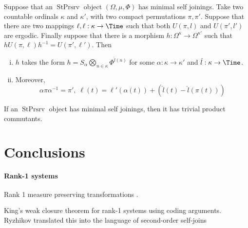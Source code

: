 \documentclass[12pt,oneside,pb-diagram]{article}
\DeclareMathOperator{\sps}{StPrsrv}
\begin{document}
\begin{definition} 
	
\end{definition}

\begin{lemma}
	\cite[Thm 3.1]{Rudolph1979join} Suppose that an $\sps$ object $(\Omega, \mu, \Phi)$ has minimal self joinings. Take two countable ordinals $\kappa$ and $\kappa'$, with two compact permutations $\pi , \pi'$. Suppose that there are two mappings $\ell, \ell : \kappa \to \Time$ such that both $U(\pi, l)$ and $U(\pi', l')$ are ergodic. Finally suppose that there is a morphism $h : \Omega^{\kappa} \to \Omega^{\kappa'}$ such that $h U(\pi, \ell) h^{-1} = U(\pi', \ell')$. Then
	\begin{enumerate} [(i)]
		\item $h$ takes the form $h = S_\alpha \bigotimes_{n \in \kappa} \Phi^{\hat{l}(n)}$ for some $\alpha : \kappa \to \kappa'$ and $\hat{l} : \kappa \to \Time$.
		\item Moreover,
		\[ \alpha \pi \alpha^{-1} = \pi', \; \ell(t) = \ell'(\alpha(t)) + (\hat{l}(t) - \hat{l}(\pi(t))) \]
	\end{enumerate}
\end{lemma}

\begin{lemma}
	\cite[Cor 3.2]{Rudolph1979join} If an $\sps$ object has minimal self joinings, then it has trivial product commutants.
\end{lemma}

\section{Conclusions} \label{sec:conclus}

\paragraph{Rank-1 systems} Rank 1 measure preserving transformations \cite[e.g.]{Ferenczi1997rank, Nadkarni1998book, Nadkarni2011book}.

King's weak closure theorem for rank-1 systems \cite{king1990map} using coding arguments. Ryzhikov \cite{Ryzhikov1993join} translated this into the language of second-order self-joins
\cite{rokhlin1949endo} \cite{Weiss1998mult} \cite{Glasner1994prop} 
\end{document}
